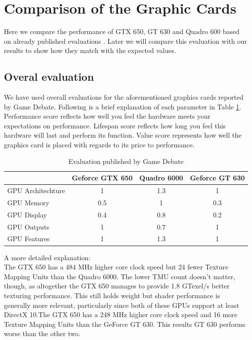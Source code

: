 \documentclass[paper=a4, fontsize=11pt]{scrartcl}
\numberwithin{equation}{section}		%
\numberwithin{figure}{section}			%
\numberwithin{table}{section}				%
\begin{document}
\newpage
\clearpage
\section{Comparison of the Graphic Cards}
Here we compare the performance of GTX 650, GT 630 and Quadro 600 based on already published evaluations \cite{game_debate}. Later we will compare this evaluation with our results to show how they match with the expected values. 

\subsection{Overal evaluation}
We have used overall evaluations for the aforementioned graphics cards reported by Game Debate. Following is a brief explanation of each parameter in Table \ref{GPU comparison}. Performance score reflects how well you feel the hardware meets your expectations on performance. Lifespan score reflects how long you feel this hardware will last and perform its function. Value score represents how well the graphics card is placed with regards to its price to performance. 

\begin{table}[!h]
\caption{Evaluation published by Game Debate}
\centering
\begin{tabular}{|l|c|c|c|}
	\hline
	 & Geforce GTX 650 & Quadro 6000 & Geforce GT 630\\
	\hline
      	GPU Architechture & 1 & 1.3 & 1 \\
	\hline
    	GPU Memory & 0.5 & 1 & 0.3 \\
	\hline
    	GPU Display & 0.4 & 0.8 & 0.2\\
	\hline
	GPU Outputs & 1 & 0.7 & 1 \\
	\hline
	GPU Features & 1 & 1.3 & 1 \\
	\hline

\end{tabular}
\label{GPU comparison}
\end{table}

A more detailed explanation:\\

The GTX 650 has a 484 MHz higher core clock speed but 24 fewer Texture Mapping Units than the Quadro 6000. The lower TMU count doesn't matter, though, as altogether the GTX 650 manages to provide 1.8 GTexel/s better texturing performance. This still holds weight but shader performance is generally more relevant, particularly since both of these GPUs support at least DirectX 10.The GTX 650 has a 248 MHz higher core clock speed and 16 more Texture Mapping Units than the GeForce GT 630. This results GT 630 performs worse than the other two.\\
\end{document}
